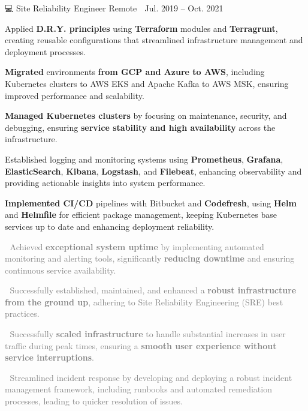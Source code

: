 \documentclass[11pt, a4paper]{awesome-cv}
\newcommand{\hll}[1]{\noindent\colorbox{light-gray}{\parbox{18cm}{\textcolor{gray}{#1}}}}
\begin{document}
{\begin{cventries}
		{💻 Site Reliability Engineer} %
		{Remote 📍} %
		{Jul. 2019 – Oct. 2021 📆} %
		{\begin{cvitems}
				\item{Applied \textbf{D.R.Y. principles} using \textbf{Terraform} modules and
				            \textbf{Terragrunt}, creating reusable configurations that streamlined
				            infrastructure management and deployment processes.}
				\item{\textbf{Migrated} environments \textbf{from GCP and Azure to AWS}, including
				            Kubernetes clusters to AWS EKS and Apache Kafka to AWS MSK, ensuring improved
				            performance and scalability.}
				\item{\textbf{Managed Kubernetes clusters} by focusing on maintenance, security, and
				            debugging, ensuring \textbf{service stability and high availability} across the
				            infrastructure.}
				\item{Established logging and monitoring systems using \textbf{Prometheus},
				            \textbf{Grafana}, \textbf{ElasticSearch}, \textbf{Kibana}, \textbf{Logstash}, and
				            \textbf{Filebeat}, enhancing observability and providing actionable insights into
				            system performance.}
				\item{\textbf{Implemented CI/CD} pipelines with Bitbucket and \textbf{Codefresh}, using
				            \textbf{Helm} and \textbf{Helmfile} for efficient package management, keeping Kubernetes
				            base services up to date and enhancing deployment reliability.}
				\\
				\newline
				\hll{🎯 Achieved \textbf{exceptional system uptime} by implementing automated
					monitoring and alerting tools, significantly \textbf{reducing downtime} and
					ensuring continuous service availability.}
				\hll{🎯 Successfully established, maintained, and enhanced a \textbf{robust
						infrastructure from the ground up}, adhering to Site Reliability Engineering (SRE)
					best practices.}
				\hll{🎯 Successfully \textbf{scaled infrastructure} to handle substantial increases
					in user traffic during peak times, ensuring a \textbf{smooth user experience without
						service interruptions}.}
				\hll{🎯 Streamlined incident response by developing and deploying a robust incident
					management framework, including runbooks and automated remediation processes, leading
					to quicker resolution of issues.}
			\end{cvitems}
		}



\end{cventries}}
\end{document}
